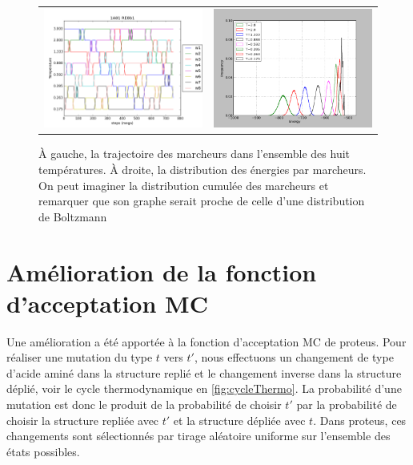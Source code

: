    \begin{figure}[!htbp]
     \centering
     \begin{tabular}{cc}
       \includegraphics[width=8cm]{figure/re8_Ttraj.png}  &
       \includegraphics[width=8cm]{figure/re8_distri.png}  &
     \end{tabular}     
     \caption{ À gauche, la trajectoire des marcheurs dans l'ensemble des huit températures. À droite, la distribution des énergies par marcheurs. On peut imaginer la distribution cumulée des marcheurs et remarquer que son graphe serait proche de celle d'une distribution de Boltzmann}
\label{fig:proteusREMC}
   \end{figure}
   

   \section{Amélioration de la fonction d'acceptation MC}

   Une amélioration a été apportée à la fonction d'acceptation MC de proteus. Pour réaliser une mutation du type $t$ vers $t'$, nous effectuons un changement de type d'acide aminé dans la structure replié et le changement inverse dans la structure déplié, voir le cycle thermodynamique en \ref{fig:cycleThermo}. La probabilité d'une mutation est donc le produit de la probabilité de choisir $t'$ par la probabilité de choisir la structure repliée avec $t'$ et la structure dépliée avec $t$. Dans proteus, ces changements sont sélectionnés par tirage aléatoire uniforme sur l'ensemble des états possibles. 

